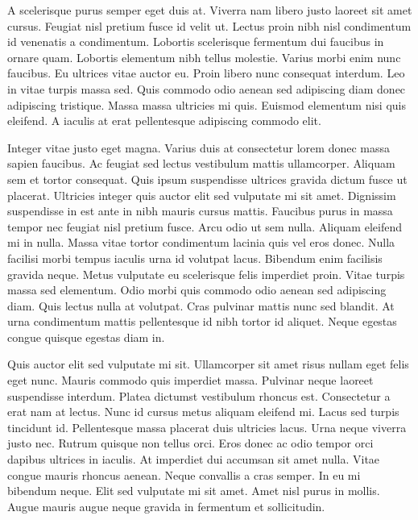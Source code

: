\documentclass[11pt,a4paper]{article}
\begin{document}
A scelerisque purus semper eget duis at. Viverra nam libero justo laoreet sit amet cursus. Feugiat nisl pretium fusce id velit ut. Lectus proin nibh nisl condimentum id venenatis a condimentum. Lobortis scelerisque fermentum dui faucibus in ornare quam. Lobortis elementum nibh tellus molestie. Varius morbi enim nunc faucibus. Eu ultrices vitae auctor eu. Proin libero nunc consequat interdum. Leo in vitae turpis massa sed. Quis commodo odio aenean sed adipiscing diam donec adipiscing tristique. Massa massa ultricies mi quis. Euismod elementum nisi quis eleifend. A iaculis at erat pellentesque adipiscing commodo elit.

Integer vitae justo eget magna. Varius duis at consectetur lorem donec massa sapien faucibus. Ac feugiat sed lectus vestibulum mattis ullamcorper. Aliquam sem et tortor consequat. Quis ipsum suspendisse ultrices gravida dictum fusce ut placerat. Ultricies integer quis auctor elit sed vulputate mi sit amet. Dignissim suspendisse in est ante in nibh mauris cursus mattis. Faucibus purus in massa tempor nec feugiat nisl pretium fusce. Arcu odio ut sem nulla. Aliquam eleifend mi in nulla. Massa vitae tortor condimentum lacinia quis vel eros donec. Nulla facilisi morbi tempus iaculis urna id volutpat lacus. Bibendum enim facilisis gravida neque. Metus vulputate eu scelerisque felis imperdiet proin. Vitae turpis massa sed elementum. Odio morbi quis commodo odio aenean sed adipiscing diam. Quis lectus nulla at volutpat. Cras pulvinar mattis nunc sed blandit. At urna condimentum mattis pellentesque id nibh tortor id aliquet. Neque egestas congue quisque egestas diam in.

Quis auctor elit sed vulputate mi sit. Ullamcorper sit amet risus nullam eget felis eget nunc. Mauris commodo quis imperdiet massa. Pulvinar neque laoreet suspendisse interdum. Platea dictumst vestibulum rhoncus est. Consectetur a erat nam at lectus. Nunc id cursus metus aliquam eleifend mi. Lacus sed turpis tincidunt id. Pellentesque massa placerat duis ultricies lacus. Urna neque viverra justo nec. Rutrum quisque non tellus orci. Eros donec ac odio tempor orci dapibus ultrices in iaculis. At imperdiet dui accumsan sit amet nulla. Vitae congue mauris rhoncus aenean. Neque convallis a cras semper. In eu mi bibendum neque. Elit sed vulputate mi sit amet. Amet nisl purus in mollis. Augue mauris augue neque gravida in fermentum et sollicitudin.
\end{document}
